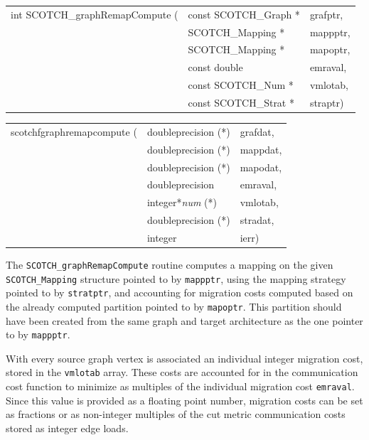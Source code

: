 \begin{itemize}
\progsyn

{\tt\begin{tabular}{l@{}ll}
int SCOTCH\_graphRemapCompute ( & const SCOTCH\_Graph * & grafptr, \\
                                & SCOTCH\_Mapping *     & mappptr, \\
                                & SCOTCH\_Mapping *     & mapoptr, \\
                                & const double          & emraval, \\
                                & const SCOTCH\_Num *   & vmlotab, \\
                                & const SCOTCH\_Strat * & straptr)
\end{tabular}}

{\tt\begin{tabular}{l@{}ll}
scotchfgraphremapcompute ( & doubleprecision (*)   & grafdat, \\
                           & doubleprecision (*)   & mappdat, \\
                           & doubleprecision (*)   & mapodat, \\
                           & doubleprecision       & emraval, \\
                           & integer*{\it num} (*) & vmlotab, \\
                           & doubleprecision (*)   & stradat, \\
                           & integer               & ierr)
\end{tabular}}

\progdes

The {\tt SCOTCH\_graphRemapCompute} routine computes a mapping
on the given {\tt SCOTCH\_\lbt Mapping} structure pointed
to by {\tt mappptr}, using the mapping strategy pointed to
by {\tt stratptr}, and accounting for migration costs computed
based on the already computed partition pointed to by
{\tt mapoptr}. This partition should have been created from the same
graph and target architecture as the one pointer to by {\tt mappptr}.

With every source graph vertex is associated an individual integer
migration cost, stored in the {\tt vmlotab} array. These costs are
accounted for in the communication cost function to minimize as
multiples of the individual migration cost {\tt emraval}. Since this
value is provided as a floating point number, migration costs can be
set as fractions or as non-integer multiples of the cut metric
communication costs stored as integer edge loads.


\end{itemize}
